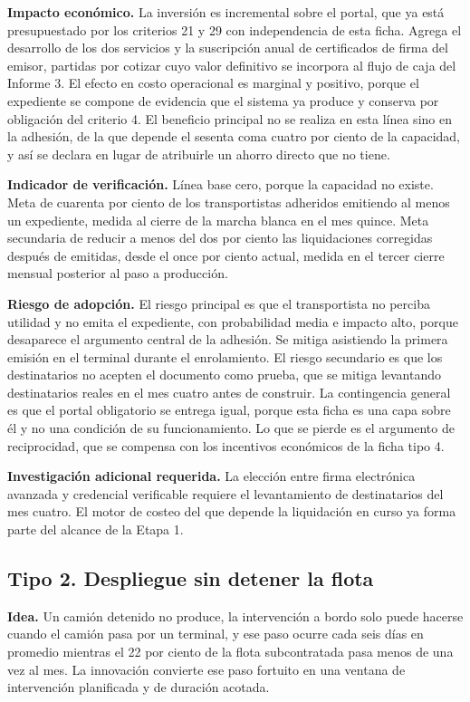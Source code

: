 \textbf{Impacto económico.} La inversión es incremental sobre el portal, que ya está presupuestado
por los criterios 21 y 29 con independencia de esta ficha. Agrega el desarrollo de los dos
servicios y la suscripción anual de certificados de firma del emisor, partidas por cotizar cuyo
valor definitivo se incorpora al flujo de caja del Informe 3. El efecto en costo operacional es
marginal y positivo, porque el expediente se compone de evidencia que el sistema ya produce y
conserva por obligación del criterio 4. El beneficio principal no se realiza en esta línea sino en
la adhesión, de la que depende el sesenta coma cuatro por ciento de la capacidad, y así se declara
en lugar de atribuirle un ahorro directo que no tiene.

\textbf{Indicador de verificación.} Línea base cero, porque la capacidad no existe. Meta de
cuarenta por ciento de los transportistas adheridos emitiendo al menos un expediente, medida al
cierre de la marcha blanca en el mes quince. Meta secundaria de reducir a menos del dos por ciento
las liquidaciones corregidas después de emitidas, desde el once por ciento actual, medida en el
tercer cierre mensual posterior al paso a producción.

\textbf{Riesgo de adopción.} El riesgo principal es que el transportista no perciba utilidad y no
emita el expediente, con probabilidad media e impacto alto, porque desaparece el argumento central
de la adhesión. Se mitiga asistiendo la primera emisión en el terminal durante el enrolamiento. El
riesgo secundario es que los destinatarios no acepten el documento como prueba, que se mitiga
levantando destinatarios reales en el mes cuatro antes de construir. La contingencia general es que
el portal obligatorio se entrega igual, porque esta ficha es una capa sobre él y no una condición
de su funcionamiento. Lo que se pierde es el argumento de reciprocidad, que se compensa con los
incentivos económicos de la ficha tipo 4.

\textbf{Investigación adicional requerida.} La elección entre firma electrónica avanzada y
credencial verificable requiere el levantamiento de destinatarios del mes cuatro. El motor de
costeo del que depende la liquidación en curso ya forma parte del alcance de la Etapa 1.

\subsection{Tipo 2. Despliegue sin detener la flota}

\textbf{Idea.} Un camión detenido no produce, la intervención a bordo solo puede hacerse cuando el
camión pasa por un terminal, y ese paso ocurre cada seis días en promedio mientras el 22 por ciento
de la flota subcontratada pasa menos de una vez al mes. La innovación convierte ese paso fortuito
en una ventana de intervención planificada y de duración acotada.

